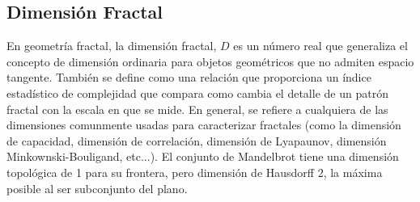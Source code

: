 \documentclass[a4paper]{article}
\begin{document}
	\subsection{Dimensión Fractal}
		En geometría fractal, la dimensión fractal, $D$ es un número real que generaliza el concepto de dimensión ordinaria para objetos geométricos que no admiten espacio tangente.
		También se define como una relación que proporciona un índice estadístico de complejidad que compara como cambia el detalle de un patrón fractal con la escala en que se mide. En general, se refiere a cualquiera de las dimensiones comunmente usadas para caracterizar fractales (como la dimensión de capacidad, dimensión de correlación, dimensión de Lyapaunov, dimensión Minkownski-Bouligand, etc...).
		El conjunto de Mandelbrot tiene una dimensión topológica de 1 para su frontera, pero dimensión de Hausdorff 2, la máxima posible al ser subconjunto del plano.
		
\end{document}
